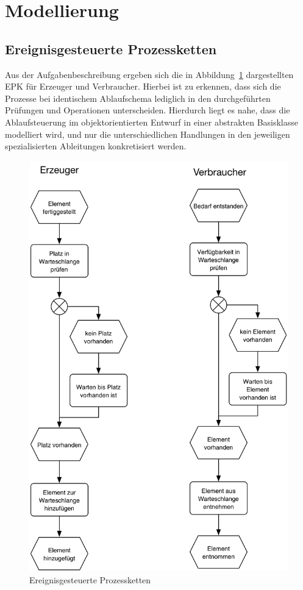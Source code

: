 \section{Modellierung} %
\label{sec:modellierung}

\subsection{Ereignisgesteuerte Prozessketten} %
\label{sub:ereignisgesteuerte_prozessketten}

Aus der Aufgabenbeschreibung ergeben sich die in Abbildung~\ref{fig:epk} dargestellten \ac{EPK} für Erzeuger und Verbraucher. Hierbei ist zu erkennen, dass sich die Prozesse bei identischem Ablaufschema lediglich in den  durchgeführten Prüfungen und Operationen unterscheiden. Hierdurch liegt es nahe, dass die Ablaufsteuerung im objektorientierten Entwurf in einer abstrakten Basisklasse modelliert wird, und nur die unterschiedlichen Handlungen in den jeweiligen spezialisierten Ableitungen konkretisiert werden.

\begin{figure}[H]
\begin{center}
\includegraphics[width=.5\textwidth]{Erzeuger-Verbraucher-EPK.jpg}
\caption{Ereignisgesteuerte Prozessketten}
\label{fig:epk}
\end{center}
\end{figure}


